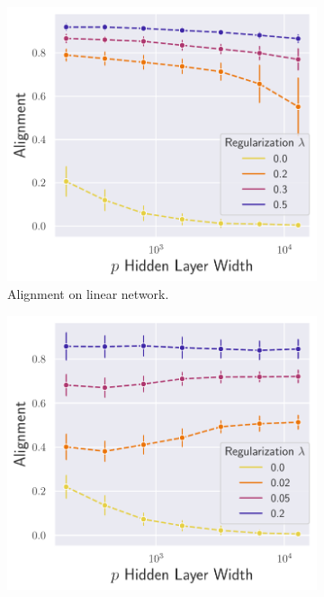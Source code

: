 \begin{figure}[ht]
\centering
\begin{subfigure}[b]{.33\textwidth}
  \centering
  \includegraphics[width=\linewidth]{figures/df_lr_non_autograd_l2_v6.pdf}
  \caption{Alignment on linear network.}
  \label{fig:align_lr_non_autograd_l2}
\end{subfigure}\hfill
\begin{subfigure}[b]{.33\textwidth}
  \centering
  \includegraphics[width=\linewidth]{figures/df_nn_relu_autograd_l2_v6.pdf}

\end{subfigure}
\end{figure}
